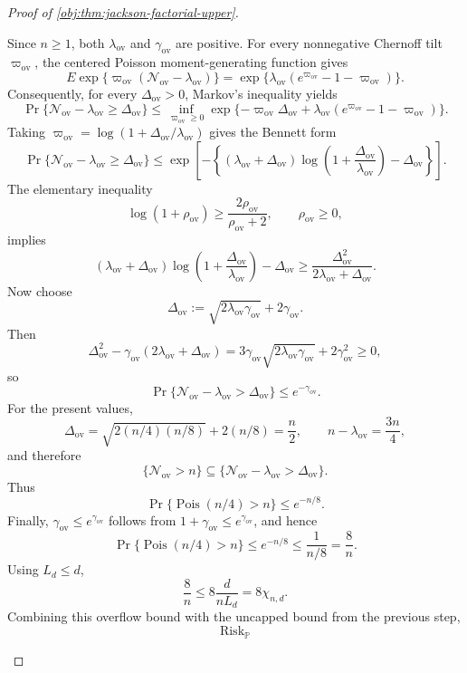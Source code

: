\begin{proof}[Proof of \cref{obj:thm:jackson-factorial-upper}]
\begin{enumerate}
\[\]
Since \(n\ge1\), both \(\lambda_{\mathrm{ov}}\) and \(\gamma_{\mathrm{ov}}\) are
positive.  For every nonnegative Chernoff tilt \(\varpi_{\mathrm{ov}}\), the
centered Poisson moment-generating function gives
\[
E\exp\{\varpi_{\mathrm{ov}}(\mathcal N_{\mathrm{ov}}-\lambda_{\mathrm{ov}})\}
=
\exp\{\lambda_{\mathrm{ov}}(e^{\varpi_{\mathrm{ov}}}-1-\varpi_{\mathrm{ov}})\}.
\]
Consequently, for every \(\Delta_{\mathrm{ov}}>0\), Markov's inequality yields
\[
\Pr\{\mathcal N_{\mathrm{ov}}-\lambda_{\mathrm{ov}}\ge \Delta_{\mathrm{ov}}\}
\le
\inf_{\varpi_{\mathrm{ov}}\ge0}
\exp\{-\varpi_{\mathrm{ov}}\Delta_{\mathrm{ov}}
+\lambda_{\mathrm{ov}}(e^{\varpi_{\mathrm{ov}}}-1-\varpi_{\mathrm{ov}})\}.
\]
Taking
\(
\varpi_{\mathrm{ov}}
=\log(1+\Delta_{\mathrm{ov}}/\lambda_{\mathrm{ov}})
\)
gives the Bennett form
\[
\Pr\{\mathcal N_{\mathrm{ov}}-\lambda_{\mathrm{ov}}\ge \Delta_{\mathrm{ov}}\}
\le
\exp\left[-\left\{(\lambda_{\mathrm{ov}}+\Delta_{\mathrm{ov}})
\log\left(1+\frac{\Delta_{\mathrm{ov}}}{\lambda_{\mathrm{ov}}}\right)
-\Delta_{\mathrm{ov}}\right\}\right].
\]
The elementary inequality
\[
\log(1+\rho_{\mathrm{ov}})\ge \frac{2\rho_{\mathrm{ov}}}{\rho_{\mathrm{ov}}+2},
\qquad \rho_{\mathrm{ov}}\ge0,
\]
implies
\[
(\lambda_{\mathrm{ov}}+\Delta_{\mathrm{ov}})
\log\left(1+\frac{\Delta_{\mathrm{ov}}}{\lambda_{\mathrm{ov}}}\right)
-\Delta_{\mathrm{ov}}
\ge
\frac{\Delta_{\mathrm{ov}}^2}{2\lambda_{\mathrm{ov}}+\Delta_{\mathrm{ov}}}.
\]
Now choose
\[
\Delta_{\mathrm{ov}}
:=
\sqrt{2\lambda_{\mathrm{ov}}\gamma_{\mathrm{ov}}}+2\gamma_{\mathrm{ov}}.
\]
Then
\[
\Delta_{\mathrm{ov}}^2
-\gamma_{\mathrm{ov}}(2\lambda_{\mathrm{ov}}+\Delta_{\mathrm{ov}})
=
3\gamma_{\mathrm{ov}}\sqrt{2\lambda_{\mathrm{ov}}\gamma_{\mathrm{ov}}}
+2\gamma_{\mathrm{ov}}^2
\ge0,
\]
so
\[
\Pr\{\mathcal N_{\mathrm{ov}}-\lambda_{\mathrm{ov}}>\Delta_{\mathrm{ov}}\}
\le e^{-\gamma_{\mathrm{ov}}}.
\]
For the present values,
\[
\Delta_{\mathrm{ov}}
=\sqrt{2(n/4)(n/8)}+2(n/8)
=\frac n2,
\qquad
n-\lambda_{\mathrm{ov}}=\frac{3n}{4},
\]
and therefore
\[
\{\mathcal N_{\mathrm{ov}}>n\}
\subseteq
\{\mathcal N_{\mathrm{ov}}-\lambda_{\mathrm{ov}}>\Delta_{\mathrm{ov}}\}.
\]
Thus
\[
\Pr\{\operatorname{Pois}(n/4)>n\}
\le e^{-n/8}.
\]
Finally, \(\gamma_{\mathrm{ov}}\le e^{\gamma_{\mathrm{ov}}}\) follows from
\(1+\gamma_{\mathrm{ov}}\le e^{\gamma_{\mathrm{ov}}}\), and hence
\[
\Pr\{\operatorname{Pois}(n/4)>n\}
\le e^{-n/8}
\le \frac{1}{n/8}
=
\frac8n .
\]
Using \(L_d\le d\),
\[
\frac8n\le 8\frac{d}{nL_d}=8\chi_{n,d}.
\]
Combining this overflow bound with the uncapped bound from the previous step,
\[
\operatorname{Risk}_{\mathbb P}
\]
\end{enumerate}
\end{proof}
